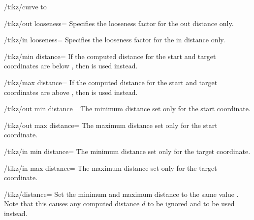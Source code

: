 \begin{key}{/tikz/curve to}
    \begin{key}{/tikz/out looseness=}
        Specifies the looseness factor for the out distance only.
    \end{key}

    \begin{key}{/tikz/in looseness=}
        Specifies the looseness factor for the in distance only.
    \end{key}
    \begin{key}{/tikz/min distance=}
        If the computed distance for the start and target coordinates are below
        , then  is used instead.
    \end{key}
    \begin{key}{/tikz/max distance=}
        If the computed distance for the start and target coordinates are above
        , then  is used instead.
    \end{key}
    \begin{key}{/tikz/out min distance=}
        The minimum distance set only for the start coordinate.
    \end{key}
    \begin{key}{/tikz/out max distance=}
        The maximum distance set only for the start coordinate.
    \end{key}
    \begin{key}{/tikz/in min distance=}
        The minimum distance set only for the target coordinate.
    \end{key}
    \begin{key}{/tikz/in max distance=}
        The maximum distance set only for the target coordinate.
    \end{key}
    \begin{key}{/tikz/distance=}
        Set the minimum and maximum distance to the same value .
        Note that this causes any computed distance $d$ to be ignored and
         to be used instead.
\begin{codeexample}[]
\end{codeexample}
    \end{key}

\end{key}
